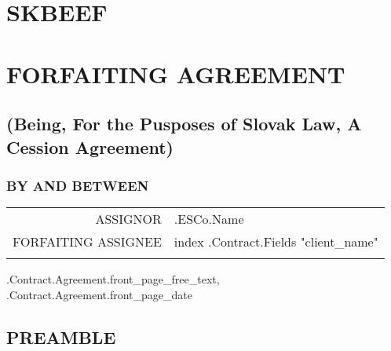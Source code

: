 \documentclass[a4paper]{article}
\begin{document}
\renewcommand\thesection{}
\renewcommand\thesubsection{}
\renewcommand\thesubsubsection{}

\begin{center}

  \vspace*{\fill}
  \section{SKBEEF}
  \section{FORFAITING AGREEMENT}
  \subsection{(Being, For the Pusposes of Slovak Law, A Cession Agreement)}
  \vspace*{\fill}

  \vspace{8cm}

  \subsubsection{BY AND BETWEEN}

  \vspace{1cm}

  \begin{tabu}{|r|X[2]|} \tabucline{}

    ASSIGNOR&{{.ESCo.Name}}\\\tabucline{}

    FORFAITING ASSIGNEE&{{index .Contract.Fields "client_name"}}\\\tabucline{}

  \end{tabu}

  \iffalse input forfaitingFields.front_page_free_text value="{{.Contract.Agreement.front_page_free_text}}" \fi {{.Contract.Agreement.front_page_free_text}}, \iffalse input forfaitingFields.front_page_date value="{{.Contract.Agreement.front_page_date}}" type="date" \fi {{.Contract.Agreement.front_page_date}}

\end{center}

\pagebreak

\begin{center}
	\section{PREAMBLE}
\end{center}
\end{document}
